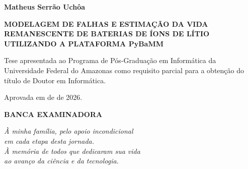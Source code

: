 \documentclass[
    12pt,
    openright,
    twoside,
    a4paper,
    brazil,
    english
]{abntex2}
\begin{document}
\begin{folhadeaprovacao}
  \begin{center}
    {\ABNTEXchapterfont\bfseries\large Matheus Serr\~ao Uch\^oa}

    \vspace*{0.5cm}

    {\ABNTEXchapterfont\bfseries\Large
    MODELAGEM DE FALHAS E ESTIMAÇÃO DA VIDA\\
    REMANESCENTE DE BATERIAS DE ÍONS DE LÍTIO\\
    UTILIZANDO A PLATAFORMA PyBaMM}

    \vspace*{0.5cm}

    Tese apresentada ao Programa de Pós-Graduação em Informática da
    Universidade Federal do Amazonas como requisito parcial para a
    obtenção do título de Doutor em Informática.

    Aprovada em \underline{\hspace{2cm}} de \underline{\hspace{3cm}} de 2026.

    \textbf{BANCA EXAMINADORA}

    \vspace*{1cm}

  \end{center}
\end{folhadeaprovacao}

\begin{dedicatoria}
  \vspace*{\fill}
  \centering
  \noindent
  \textit{
    À minha família, pelo apoio incondicional\\
    em cada etapa desta jornada.\\
    À memória de todos que dedicaram sua vida\\
    ao avanço da ciência e da tecnologia.
  }
  \vspace*{\fill}
\end{dedicatoria}
\end{document}
